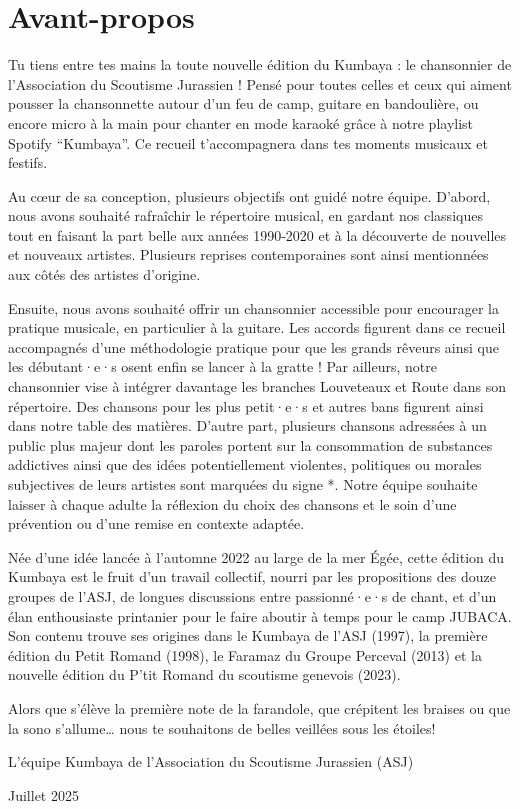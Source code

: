 \section*{Avant-propos}
\small Tu tiens entre tes mains la toute nouvelle édition du Kumbaya : le chansonnier de l'Association du Scoutisme Jurassien ! Pensé pour toutes celles et ceux qui aiment pousser la chansonnette autour d'un feu de camp, guitare en bandoulière, ou encore micro à la main pour chanter en mode karaoké grâce à notre playlist Spotify “Kumbaya”. Ce recueil t'accompagnera dans tes moments musicaux et festifs.

Au cœur de sa conception, plusieurs objectifs ont guidé notre équipe. D'abord, nous avons souhaité rafraîchir le répertoire musical, en gardant nos classiques tout en faisant la part belle aux années 1990-2020 et à la découverte de nouvelles et nouveaux artistes. Plusieurs reprises contemporaines sont ainsi mentionnées aux côtés des artistes d'origine.

Ensuite, nous avons souhaité offrir un chansonnier accessible pour encourager la pratique musicale, en particulier à la guitare. Les accords figurent dans ce recueil accompagnés d'une méthodologie pratique pour que les grands rêveurs ainsi que les débutant·e·s osent enfin se lancer à la gratte !
Par ailleurs, notre chansonnier vise à intégrer davantage les branches Louveteaux et Route dans son répertoire. Des chansons pour les plus petit·e·s et autres bans figurent ainsi dans notre table des matières. D'autre part, plusieurs chansons adressées à un public plus majeur dont les paroles portent sur la consommation de substances addictives ainsi que des idées potentiellement violentes, politiques ou morales subjectives de leurs artistes sont marquées du signe *. Notre équipe souhaite laisser à chaque adulte la réflexion du choix des chansons et le soin d'une prévention ou d'une remise en contexte adaptée.

Née d'une idée lancée à l'automne 2022 au large de la mer Égée, cette édition du Kumbaya est le fruit d'un travail collectif, nourri par les propositions des douze groupes de l'ASJ, de longues discussions entre passionné·e·s de chant, et d'un élan enthousiaste printanier pour le faire aboutir à temps pour le camp JUBACA. Son contenu trouve ses origines dans le Kumbaya de l'ASJ (1997), la première édition du Petit Romand (1998), le Faramaz du Groupe Perceval (2013) et la nouvelle édition du P'tit Romand du scoutisme genevois (2023).

Alors que s'élève la première note de la farandole, que crépitent les braises ou que la sono s'allume… nous te souhaitons de belles veillées sous les étoiles!

L'équipe Kumbaya de l'Association du Scoutisme Jurassien (ASJ)

Juillet 2025
